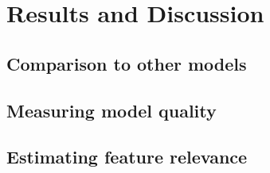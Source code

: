 \chapter{Results and Discussion}
\label{Results}


\section{Comparison to other models}
\label{Benchmarking}

\section{Measuring model quality}
\label{ModelQuality}

\section{Estimating feature relevance}
\label{FeatureRelevance}

